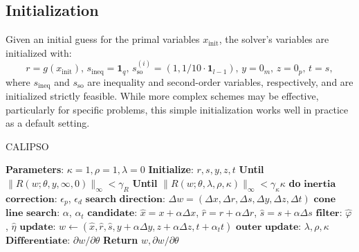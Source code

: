 \subsection{Initialization}

Given an initial guess for the primal variables $x_{\mbox{init}}$, the solver's variables are initialized with:
\begin{equation} 
  r = g(x_{\mbox{init}}), \,
  s_{\mbox{ineq}} = \mathbf{1}_q, \,
  s_{\mbox{so}}^{(i)} = (1, 1 / 10 \cdot \mathbf{1}_{l-1}), \,
  y = 0_m, \,
  z = 0_p, \,
  t = s, \label{calipso_initialize}
\end{equation}
where $s_{\mbox{ineq}}$ and $s_{\mbox{so}}$ are inequality and second-order variables, respectively, and are initialized strictly feasible. While more complex schemes may be effective, particularly for specific problems, this simple initialization works well in practice as a default setting.

\begin{algorithm}[H]
	\caption{CALIPSO}\label{calipso_algorithm}
	\begin{algorithmic}[H]
		\State \textbf{Parameters}: $\kappa = 1, \rho = 1, \lambda = 0$
		\State \textbf{Initialize}: $r, s, y, z, t$
		\State \textbf{Until} $\| R(w; \theta, y, \infty, 0) \|_{\infty} < \gamma_R$
		\State \indent \textbf{Until} $\|R(w; \theta, \lambda, \rho, \kappa)\|_{\infty} < \gamma_{\kappa} \kappa$ \textbf{do}
		\State \indent \indent $\mathbf{inertia}$ $\mathbf{correction}$: $\epsilon_p$, $\epsilon_d$ 
		\State \indent \indent $\mathbf{search}$ $\mathbf{direction}$: $\Delta w = (\Delta x, \Delta r, \Delta s, \Delta y, \Delta z, \Delta t)$ 
		\State \indent \indent $\mathbf{cone}$ $\mathbf{line}$ $\mathbf{search}$: $\alpha$, $\alpha_t$
		\State \indent \indent $\mathbf{candidate}$: $\hat{x} = x + \alpha \Delta x$, $\hat{r} = r + \alpha \Delta r$, $\hat{s} = s + \alpha \Delta s$
		\State \indent \indent $\mathbf{filter}$: $\hat{\varphi}$, $\hat{\eta}$
		\State \indent \indent $\mathbf{update}$: $w \leftarrow (\hat{x}, \hat{r}, \hat{s}, y + \alpha \Delta y, z + \alpha \Delta z, t + \alpha_t t)$
		\State \indent $\mathbf{outer}$ $\mathbf{update}$: $\lambda, \rho, \kappa$ 
		\State $\mathbf{Differentiate}$: $\partial w / \partial \theta$ 
		\State \textbf{Return} $w, \partial w / \partial \theta$
		\EndProcedure
	\end{algorithmic}
\end{algorithm}

